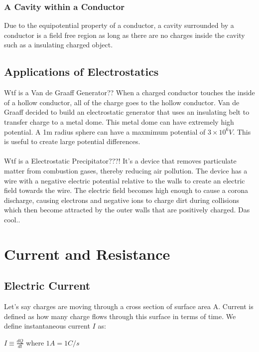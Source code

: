 \documentclass{report}
\begin{document}
		\subsection{A Cavity within a Conductor}
			Due to the equipotential property of a conductor, a cavity surrounded by a conductor is a field free region as long as there are no charges inside the cavity such as a insulating charged object.
	\section{Applications of Electrostatics}
		Wtf is a Van de Graaff Generator?? When a charged conductor touches the inside of a hollow conductor, all of the charge goes to the hollow conductor. Van de Graaff decided to build an electrostatic generator that uses an insulating belt to transfer charge to a metal dome. This metal dome can have extremely high potential. A 1m radius sphere can have a maxmimum potential of $ 3 \times 10^6 V$. This is useful to create large potential differences. \\
		\\
		Wtf is a Electrostatic Precipitator???! It's a device that removes particulate matter from combustion gases, thereby reducing air pollution. The device has a wire with a negative electric potential relative to the walls to create an electric field towards the wire. The electric field becomes high enough to cause a corona discharge, causing electrons and negative ions to charge dirt during collisions which then become attracted by the outer walls that are positively charged. Das cool..
\chapter{Current and Resistance}
	\section{Electric Current}
		Let's say charges are moving through a cross section of surface area A. Current is defined as how many charge flows through this surface in terms of time. We define instantaneous current $I$ as:\\
		\centerline{$I \equiv \frac{dQ}{dt}$ where $1A = 1C/s$}
\end{document}
